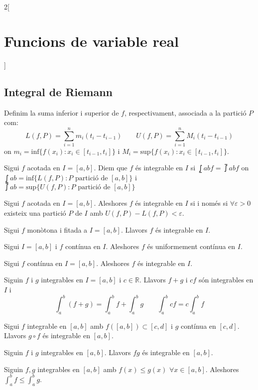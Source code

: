 \documentclass[../../../main.tex]{subfiles}
\begin{document}
\begin{multicols}{2}[\section{Funcions de variable real}]
\subsection{Integral de Riemann}
\begin{definition}
Definim la suma inferior i superior de $f$, respectivament, associada a la partició $P$ com:
$$L(f,P)=\sum_{i=1}^nm_i(t_i-t_{i-1})\qquad U(f,P)=\sum_{i=1}^nM_i(t_i-t_{i-1})$$
on $m_i=\text{inf}\{f(x_i):x_i\in[t_{i-1},t_i]\}$ i $M_i=\text{sup}\{f(x_i):x_i\in[t_{i-1},t_i]\}$.
\end{definition}
\begin{definition}
Sigui $f$ acotada en $I=[a,b]$. Diem que $f$ és integrable en $I$ si $\lowint{a}{b}f=\upint{a}{b}f$ on $\lowint{a}{b}=\text{inf}\{L(f,P):P \text{ partició de }[a,b]\}$ i $\upint{a}{b}=\text{sup}\{U(f,P):P \text{ partició de }[a,b]\}$
\end{definition}
\begin{lemma}
Sigui $f$ acotada en $I=[a,b]$. Aleshores $f$ és integrable en $I$ si i només si $\forall\varepsilon>0$ existeix una partició $P$ de $I$ amb $U(f,P)-L(f,P)<\varepsilon$.
\end{lemma}
\begin{theorem}
Sigui $f$ monòtona i fitada a $I=[a,b]$. Llavors $f$ és integrable en $I$.
\end{theorem}
\begin{theorem}
Sigui $I=[a,b]$ i $f$ contínua en $I$. Aleshores $f$ és uniformement contínua en $I$.
\end{theorem}
\begin{theorem}
Sigui $f$ contínua en $I=[a,b]$. Aleshores $f$ és integrable en $I$.
\end{theorem}
\begin{prop}
Siguin $f$ i $g$ integrables en $I=[a,b]$ i $c\in\mathbb{R}$. Llavors $f+g$ i $cf$  són integrables en $I$ i $$\int_a^b(f+g)=\int_a^bf+\int_a^bg\qquad \int_a^bcf=c\int_a^bf$$
\end{prop}
\begin{theorem}
Sigui $f$ integrable en $[a,b]$ amb $f([a,b])\subset[c,d]$ i $g$ contínua en $[c,d]$. Llavors $g\circ f$ és integrable en $[a,b]$.
\end{theorem}
\begin{corollary}
Siguin $f$ i $g$ integrables en $[a,b]$. Llavors $fg$ és integrable en $[a,b]$.
\end{corollary}
\begin{prop}
Siguin $f,g$ integrables en $[a,b]$ amb $f(x)\leq g(x)$ $\forall x\in [a,b]$. Aleshores $\int_a^bf\leq\int_a^bg$.

\end{prop}
\end{multicols}
\end{document}
